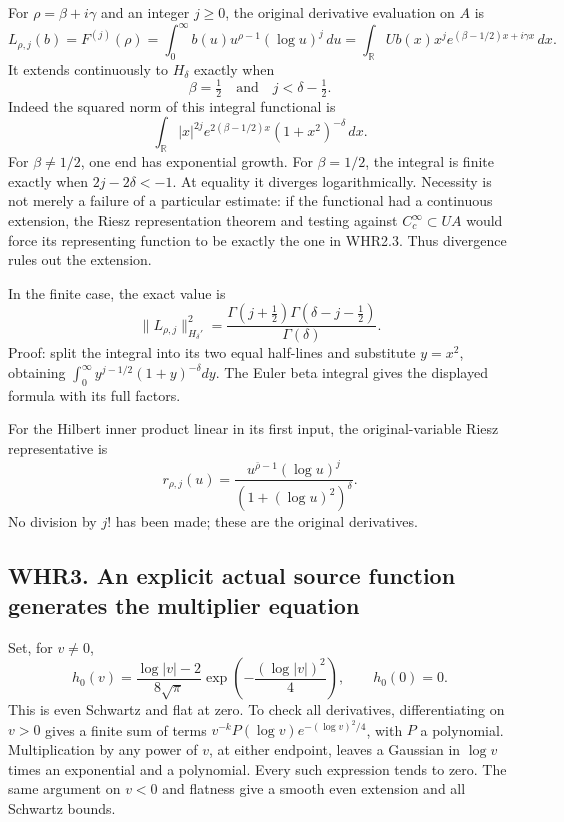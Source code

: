 For \(\rho=\beta+i\gamma\) and an integer \(j\geq0\), the original
derivative evaluation on \(A\) is \[
 L_{\rho,j}(b)=F^{(j)}(\rho)
 =\int_0^\infty b(u)u^{\rho-1}(\log u)^j\,du
 =\int_{\mathbb R}Ub(x)x^je^{(\beta-1/2)x+i\gamma x}\,dx.
 \tag{WHR2.1}
\] It extends continuously to \(H_\delta\) exactly when \[
 \boxed{\beta=\tfrac12\quad\text{and}\quad j<\delta-\tfrac12.}
 \tag{WHR2.2}
\] Indeed the squared norm of this integral functional is \[
 \int_{\mathbb R}|x|^{2j}e^{2(\beta-1/2)x}(1+x^2)^{-\delta}\,dx.
 \tag{WHR2.3}
\] For \(\beta\ne1/2\), one end has exponential growth. For
\(\beta=1/2\), the integral is finite exactly when \(2j-2\delta<-1\). At
equality it diverges logarithmically. Necessity is not merely a failure
of a particular estimate: if the functional had a continuous extension,
the Riesz representation theorem and testing against
\(C_c^\infty\subset U A\) would force its representing function to be
exactly the one in WHR2.3. Thus divergence rules out the extension.

In the finite case, the exact value is \[
 \|L_{\rho,j}\|_{H_\delta'}^2
 =\frac{\Gamma(j+\tfrac12)\Gamma(\delta-j-\tfrac12)}{\Gamma(\delta)}.
 \tag{WHR2.4}
\] Proof: split the integral into its two equal half-lines and
substitute \(y=x^2\), obtaining
\(\int_0^\infty y^{j-1/2}(1+y)^{-\delta}dy\). The Euler beta integral
gives the displayed formula with its full factors.

For the Hilbert inner product linear in its first input, the
original-variable Riesz representative is \[
 r_{\rho,j}(u)=
 \frac{u^{\bar\rho-1}(\log u)^j}{(1+(\log u)^2)^\delta}.
 \tag{WHR2.5}
\] No division by \(j!\) has been made; these are the original
derivatives.

\subsection{WHR3. An explicit actual source function generates the
multiplier
equation}\label{whr3.-an-explicit-actual-source-function-generates-the-multiplier-equation}

Set, for \(v\ne0\), \[
 h_0(v)=\frac{\log|v|-2}{8\sqrt\pi}
              \exp\!\left(-\frac{(\log|v|)^2}{4}\right),
 \qquad h_0(0)=0.
 \tag{WHR3.1}
\] This is even Schwartz and flat at zero. To check all derivatives,
differentiating on \(v>0\) gives a finite sum of terms
\(v^{-k}P(\log v)e^{-(\log v)^2/4}\), with \(P\) a polynomial.
Multiplication by any power of \(v\), at either endpoint, leaves a
Gaussian in \(\log v\) times an exponential and a polynomial. Every such
expression tends to zero. The same argument on \(v<0\) and flatness give
a smooth even extension and all Schwartz bounds.

